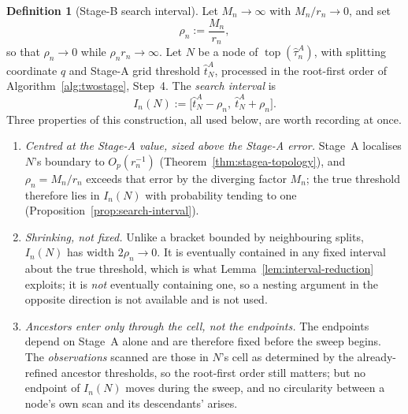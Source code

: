 \documentclass[11pt]{article}
\theoremstyle{plain}
\theoremstyle{definition}
\newtheorem{definition}[theorem]{Definition}
\theoremstyle{remark}
\newcommand{\topol}{\operatorname{top}}
\begin{document}
\begin{definition}[Stage-B search interval]\label{def:stageb-interval}
Let $M_n\to\infty$ with $M_n/r_n\to0$, and set
\[
  \rho_n:=\frac{M_n}{r_n},
\]
so that $\rho_n\to0$ while $\rho_n r_n\to\infty$. Let $N$ be a node of
$\topol(\hat\tau^A_n)$, with splitting coordinate $q$ and Stage-A grid
threshold $\hat t^A_N$, processed in the root-first order of
Algorithm~\ref{alg:twostage}, Step~4. The \emph{search interval} is
\[
  I_n(N):=\bigl[\hat t^A_N-\rho_n,\ \hat t^A_N+\rho_n\bigr].
\]
Three properties of this construction, all used below, are worth recording at
once.
\begin{enumerate}[label=(\roman*),nosep]
  \item \emph{Centred at the Stage-A value, sized above the Stage-A error.}
  Stage~A localises $N$'s boundary to $O_p(r_n^{-1})$
  (Theorem~\ref{thm:stagea-topology}), and $\rho_n=M_n/r_n$ exceeds that
  error by the diverging factor $M_n$; the true threshold therefore lies in
  $I_n(N)$ with probability tending to one
  (Proposition~\ref{prop:search-interval}).
  \item \emph{Shrinking, not fixed.} Unlike a bracket bounded by neighbouring
  splits, $I_n(N)$ has width $2\rho_n\to0$. It is eventually contained in any
  fixed interval about the true threshold, which is what
  Lemma~\ref{lem:interval-reduction} exploits; it is \emph{not} eventually
  containing one, so a nesting argument in the opposite direction is not
  available and is not used.
  \item \emph{Ancestors enter only through the cell, not the endpoints.} The
  endpoints depend on Stage~A alone and are therefore fixed before the sweep
  begins. The \emph{observations} scanned are those in $N$'s cell as
  determined by the already-refined ancestor thresholds, so the root-first
  order still matters; but no endpoint of $I_n(N)$ moves during the sweep,
  and no circularity between a node's own scan and its descendants' arises.
\end{enumerate}
\end{definition}
\end{document}
